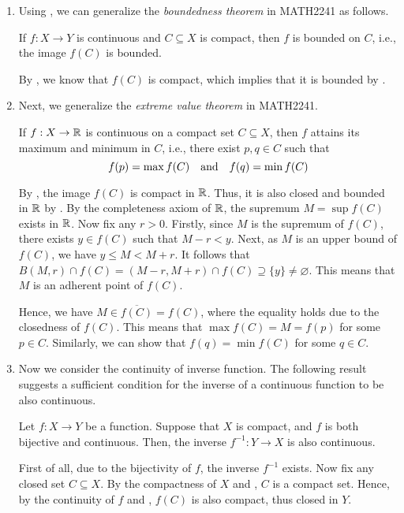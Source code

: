 \begin{enumerate}
\item Using , we can generalize the
\emph{boundedness theorem} in MATH2241 as follows.
\begin{corollary}
\label{cor:cts-cpt-bounded}
If \(f:X\to Y\) is continuous and \(C\subseteq X\) is compact, then \(f\) is
bounded on \(C\), i.e., the image \(f(C)\) is bounded.
\end{corollary}
\begin{pf}
By , we know that \(f(C)\) is compact, which
implies that it is bounded by .
\end{pf}

\item Next, we generalize the \emph{extreme value theorem} in MATH2241.

\begin{theorem}
\label{thm:cts-cpt-evt}
If \(f:X\to\mathbb{R}\) is continuous on a compact set \(C\subseteq X\), then \(f\)
attains its maximum and minimum in \(C\), i.e., there exist \(p,q\in C\) such that
\[
f(p)=\max f(C)
\qqtext{and}
f(q)=\min f(C)
\]
\end{theorem}
\begin{pf}
By , the image \(f(C)\) is compact in \(\mathbb{R}\).
Thus, it is also closed and bounded in \(\mathbb{R}\) by
. By the completeness axiom of \(\mathbb{R}\), the
supremum \(M=\sup f(C)\) exists in \(\mathbb{R}\). Now fix any \(r>0\). Firstly, since
\(M\) is the supremum of \(f(C)\), there exists \(y\in f(C)\) such that
\(M-r<y\). Next, as \(M\) is an upper bound of \(f(C)\), we have \(y\le
M<M+r\). It follows that \(B(M,r)\cap f(C)=(M-r,M+r)\cap f(C)\supseteq
\{y\}\ne\varnothing\). This means that \(M\) is an adherent point of \(f(C)\).

Hence, we have \(M\in\overline{f(C)}=f(C)\), where the equality holds due to the
closedness of \(f(C)\). This means that \(\max f(C)=M=f(p)\) for some \(p\in
C\).  Similarly, we can show that \(f(q)=\min f(C)\) for some \(q\in C\).

\end{pf}

\item Now we consider the continuity of inverse function. The following result
suggests a sufficient condition for the inverse of a continuous function to be
also continuous.

\begin{theorem}
\label{thm:cts-fn-inv-cts}
Let \(f:X\to Y\) be a function. Suppose that \(X\) is compact, and \(f\) is
both bijective and continuous. Then, the inverse \(f^{-1}:Y\to X\) is also
continuous.
\end{theorem}
\begin{pf}
First of all, due to the bijectivity of \(f\), the inverse \(f^{-1}\) exists.
Now fix any closed set \(C\subseteq X\). By the compactness of \(X\) and
, \(C\) is a compact set. Hence, by the
continuity of \(f\) and , \(f(C)\) is also
compact, thus closed in \(Y\).


\end{pf}
\end{enumerate}
